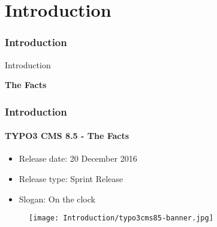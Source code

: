 %

\section{Introduction}
\begin{frame}[fragile]
	\frametitle{Introduction}

	\begin{center}\huge{Introduction}\end{center}
	\begin{center}\huge{\color{typo3darkgrey}\textbf{The Facts}}\end{center}

\end{frame}

\begin{frame}[fragile]
	\frametitle{Introduction}
	\framesubtitle{TYPO3 CMS 8.5 - The Facts}

	\begin{itemize}
		\item Release date: 20 December 2016
		\item Release type: Sprint Release
		\item Slogan: On the clock
	\end{itemize}

	\begin{figure}
		\texttt{[image: Introduction/typo3cms85-banner.jpg]}
	\end{figure}

\end{frame}

